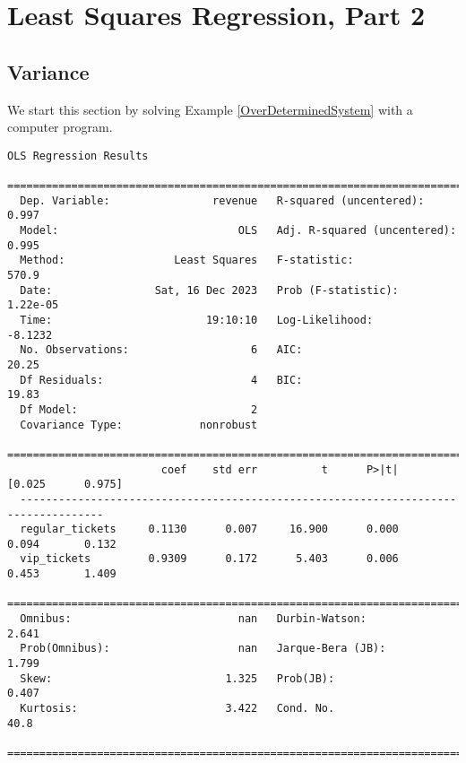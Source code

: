 \documentclass{amsbook}
\begin{document}
\section{Least Squares Regression, Part 2}
\subsection{Variance}

We start this section by solving Example \ref{OverDeterminedSystem} with a computer program.

\begin{lstlisting}[label=sm_readout]
  OLS Regression Results                                
  =======================================================================================
  Dep. Variable:                revenue   R-squared (uncentered):                   0.997
  Model:                            OLS   Adj. R-squared (uncentered):              0.995
  Method:                 Least Squares   F-statistic:                              570.9
  Date:                Sat, 16 Dec 2023   Prob (F-statistic):                    1.22e-05
  Time:                        19:10:10   Log-Likelihood:                         -8.1232
  No. Observations:                   6   AIC:                                      20.25
  Df Residuals:                       4   BIC:                                      19.83
  Df Model:                           2                                                  
  Covariance Type:            nonrobust                                                  
  ===================================================================================
                        coef    std err          t      P>|t|      [0.025      0.975]
  -----------------------------------------------------------------------------------
  regular_tickets     0.1130      0.007     16.900      0.000       0.094       0.132
  vip_tickets         0.9309      0.172      5.403      0.006       0.453       1.409
  ==============================================================================
  Omnibus:                          nan   Durbin-Watson:                   2.641
  Prob(Omnibus):                    nan   Jarque-Bera (JB):                1.799
  Skew:                           1.325   Prob(JB):                        0.407
  Kurtosis:                       3.422   Cond. No.                         40.8
  ==============================================================================
\end{lstlisting}
\end{document}
